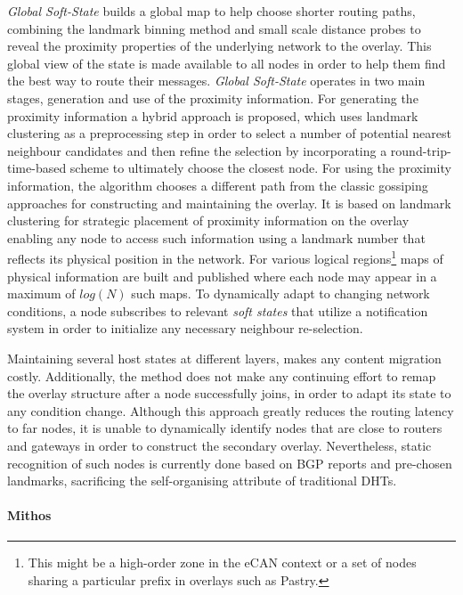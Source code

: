 \documentclass[acmcsur,acmnow]{acmtrans2m}
\begin{document}
\textit{Global Soft-State} \cite{xu_globstate_2003} builds a global map to help
choose shorter routing paths, combining the landmark binning method and small
scale distance probes to reveal the proximity properties of the underlying
network to the overlay. This global view of the state is made available to all
nodes in order to help them find the best way to route their messages.
\textit{Global Soft-State} operates in two main stages, generation and use of
the proximity information. For generating the proximity information a hybrid
approach is proposed, which uses landmark clustering as a preprocessing step in
order to select a number of potential nearest neighbour candidates and then
refine the selection by incorporating a round-trip-time-based scheme to ultimately choose the
closest node. For using the proximity information, the algorithm chooses a
different path from the classic gossiping approaches for constructing and
maintaining the overlay. It is based on landmark clustering for strategic
placement of proximity information on the overlay enabling any node to access
such information using a landmark number that reflects its physical position in
the network. For various logical regions\footnote{This might be a high-order
zone in the eCAN\cite{xu_ecan_2002} context or a set of nodes sharing a
particular prefix in overlays such as Pastry.} maps of physical information are
built and published where each node may appear in a maximum of $log\left( N
\right)$ such maps. To dynamically adapt to changing network conditions, a node
subscribes to relevant \emph{soft states} that utilize a notification system in
order to initialize any necessary neighbour re-selection.

Maintaining several host states at different layers, makes any content migration
costly. Additionally, the method does not make any continuing effort to remap the
overlay structure after a node successfully joins, in order to adapt its state to
any condition change. Although this approach greatly reduces the
routing latency to far nodes, it is unable to dynamically identify nodes that are
close to routers and gateways in order to construct the secondary overlay.
Nevertheless, static recognition of such nodes is currently done based on BGP
reports and pre-chosen landmarks, sacrificing the self-organising attribute of
traditional DHTs.

\paragraph*{\bf Mithos}
\end{document}
